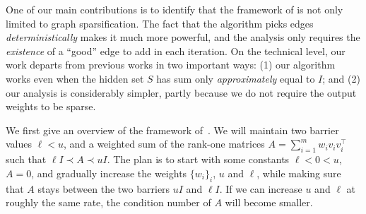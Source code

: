 One of our main contributions is to identify that the framework of \cite{BatsonSS12} is not only limited to graph sparsification.
The fact that the algorithm picks edges \emph{deterministically} makes it much more powerful,
and the analysis only requires the \emph{existence} of a ``good'' edge to add in each iteration.
On the technical level, our work departs from previous works in two important ways: (1) our algorithm works even when the hidden set $S$ has sum only \emph{approximately} equal to $I$; and (2) our analysis is considerably simpler, partly because we do not require the output weights to be sparse. %

We first give an overview of the framework of~\cite{BatsonSS12}.
We will maintain two barrier values $\ell < u$, and a weighted sum of the rank-one matrices $A = \sum_{i=1}^m w_i v_i v_i^\top$ such that $\ell I \prec A \prec u I$.
The plan is to start with some constants $\ell < 0 < u$, $A = 0$, and gradually increase the weights $\{w_i\}_i$, $u$ and $\ell$, while making sure that $A$ stays between the two barriers $u I$ and $\ell I$.
If we can increase $u$ and $\ell$ at roughly the same rate, the condition number of $A$ will become smaller.

